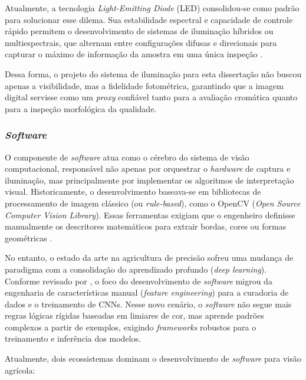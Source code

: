         Atualmente, a tecnologia \textit{Light-Emitting Diode} (LED) consolidou-se como padrão para solucionar esse dilema. Sua estabilidade espectral e capacidade de controle rápido permitem o desenvolvimento de sistemas de iluminação híbridos ou multiespectrais, que alternam entre configurações difusas e direcionais para capturar o máximo de informação da amostra em uma única inspeção \cite{cubero2010advances}.

        Dessa forma, o projeto do sistema de iluminação para esta dissertação não buscou apenas a visibilidade, mas a fidelidade fotométrica, garantindo que a imagem digital servisse como um \textit{proxy} confiável tanto para a avaliação cromática quanto para a inspeção morfológica da qualidade.


    \subsubsection{\textit{Software}}

        O componente de \textit{software} atua como o cérebro do sistema de visão computacional, responsável não apenas por orquestrar o \textit{hardware} de captura e iluminação, mas principalmente por implementar os algoritmos de interpretação visual. Historicamente, o desenvolvimento baseava-se em bibliotecas de processamento de imagem clássico (ou \textit{rule-based}), como o OpenCV (\textit{Open Source Computer Vision Library}). Essas ferramentas exigiam que o engenheiro definisse manualmente os descritores matemáticos para extrair bordas, cores ou formas geométricas \cite{opencv_library}.

        No entanto, o estado da arte na agricultura de precisão sofreu uma mudança de paradigma com a consolidação do aprendizado profundo (\textit{deep learning}). Conforme revisado por , o foco do desenvolvimento de \textit{software} migrou da engenharia de características manual (\textit{feature engineering}) para a curadoria de dados e o treinamento de CNNs. Nesse novo cenário, o \textit{software} não segue mais regras lógicas rígidas baseadas em limiares de cor, mas aprende padrões complexos a partir de exemplos, exigindo \textit{frameworks} robustos para o treinamento e inferência dos modelos.

        Atualmente, dois ecossistemas dominam o desenvolvimento de \textit{software} para visão agrícola:

